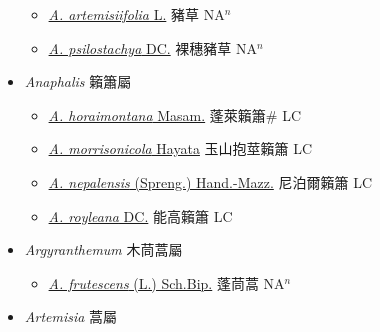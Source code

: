\begin{itemize}
  \begin{itemize}
        \item[] \href{http://www.theplantlist.org/tpl1.1/search?q=Ambrosia+artemisiifolia}{\textit{A. artemisiifolia} L.}   豬草 NA$^n$
        \item[] \href{http://www.theplantlist.org/tpl1.1/search?q=Ambrosia+psilostachya}{\textit{A. psilostachya} DC.}   裸穗豬草 NA$^n$
  \end{itemize}
 \item[] \textit{Anaphalis} 籟簫屬
                    
  \begin{itemize}
        \item[] \href{http://www.theplantlist.org/tpl1.1/search?q=Anaphalis+horaimontana}{\textit{A. horaimontana} Masam.}   蓬萊籟簫\# LC
        \item[] \href{http://www.theplantlist.org/tpl1.1/search?q=Anaphalis+morrisonicola}{\textit{A. morrisonicola} Hayata}   玉山抱莖籟簫 LC
        \item[] \href{http://www.theplantlist.org/tpl1.1/search?q=Anaphalis+nepalensis}{\textit{A. nepalensis} (Spreng.) Hand.-Mazz.}   尼泊爾籟簫 LC
        \item[] \href{http://www.theplantlist.org/tpl1.1/search?q=Anaphalis+royleana}{\textit{A. royleana} DC.}   能高籟簫 LC
  \end{itemize}
 \item[] \textit{Argyranthemum} 木茼蒿屬
                    
  \begin{itemize}
        \item[] \href{http://www.theplantlist.org/tpl1.1/search?q=Argyranthemum+frutescens}{\textit{A. frutescens} (L.) Sch.Bip.}   蓬茼蒿 NA$^n$
  \end{itemize}
 \item[] \textit{Artemisia} 蒿屬
                    

\end{itemize}
